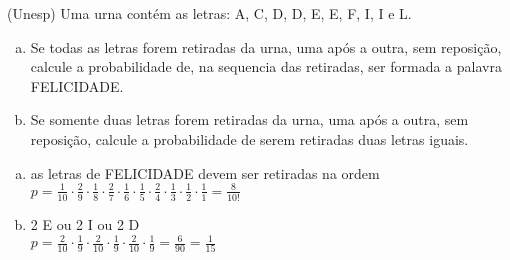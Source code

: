 \begin{ex}
 (Unesp) Uma urna contém as letras: A, C, D, D, E, E, F, I, I e L.
  \begin{enumerate} [(a)]
      \item Se todas as letras forem retiradas da urna, uma após a outra, sem reposição, calcule a probabilidade de, na sequencia das retiradas, ser formada a palavra FELICIDADE.
      \item Se somente duas letras forem retiradas da urna, uma após a outra, sem reposição, calcule a probabilidade de serem retiradas duas letras iguais.
  \end{enumerate}
    \begin{sol}
    \phantom{A}
      \begin{enumerate} [(a)]
          \item as letras de FELICIDADE devem ser retiradas na ordem \\
          $p=\frac{1}{10}\cdot\frac{2}{9}\cdot\frac{1}{8}\cdot\frac{2}{7}\cdot\frac{1}{6}\cdot\frac{1}{5}\cdot\frac{2}{4}\cdot\frac{1}{3}\cdot\frac{1}{2}\cdot\frac{1}{1}= \frac{8}{10!}$
          \item 2 E ou 2 I ou 2 D \\
          $p=\frac{2}{10}\cdot\frac{1}{9}\cdot\frac{2}{10}\cdot\frac{1}{9}\cdot\frac{2}{10}\cdot\frac{1}{9}=\frac{6}{90}=\frac{1}{15}$
      \end{enumerate}
    \end{sol}
\end{ex}